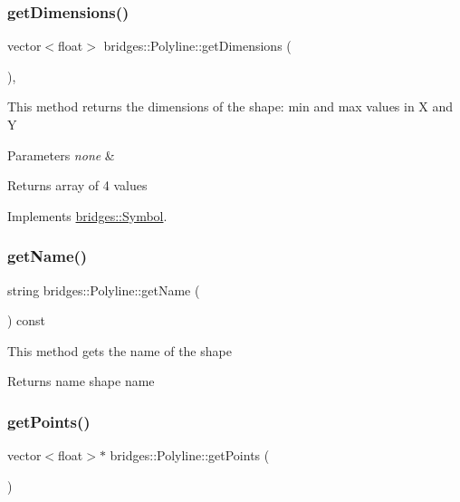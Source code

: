 \subsubsection{\texorpdfstring{getDimensions()}{getDimensions()}}
{\footnotesize\ttfamily vector$<$float$>$ bridges\+::\+Polyline\+::get\+Dimensions (\begin{DoxyParamCaption}{ }\end{DoxyParamCaption})\hspace{0.3cm}{\ttfamily [inline]}, {\ttfamily [virtual]}}

This method returns the dimensions of the shape\+: min and max values in X and Y


\begin{DoxyParams}{Parameters}
{\em none} & \\
\hline
\end{DoxyParams}
\begin{DoxyReturn}{Returns}
array of 4 values 
\end{DoxyReturn}


Implements \mbox{\hyperlink{classbridges_1_1_symbol_a6eb190dc71b31b344b7610a07c6dc1d5}{bridges\+::\+Symbol}}.

\mbox{\label{classbridges_1_1_polyline_a829fe21ce52595ecb7473a4368b136d6}} 
\subsubsection{\texorpdfstring{getName()}{getName()}}
{\footnotesize\ttfamily string bridges\+::\+Polyline\+::get\+Name (\begin{DoxyParamCaption}{ }\end{DoxyParamCaption}) const\hspace{0.3cm}{\ttfamily [inline]}}

This method gets the name of the shape

\begin{DoxyReturn}{Returns}
name shape name 
\end{DoxyReturn}
\mbox{\label{classbridges_1_1_polyline_aab7bddeace9c9e9d5b296666dd9dede5}} 
\subsubsection{\texorpdfstring{getPoints()}{getPoints()}}
{\footnotesize\ttfamily vector$<$float$>$$\ast$ bridges\+::\+Polyline\+::get\+Points (\begin{DoxyParamCaption}{ }\end{DoxyParamCaption})\hspace{0.3cm}{\ttfamily [inline]}}

